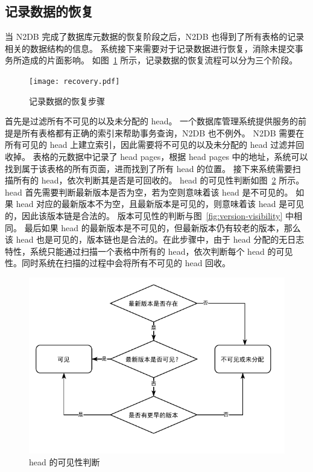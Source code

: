 \subsection{记录数据的恢复}
\label{ssec:record-recovery}

当 N2DB 完成了数据库元数据的恢复阶段之后，N2DB 也得到了所有表格的记录相关的数据结构的信息。
系统接下来需要对于记录数据进行恢复，消除未提交事务所造成的片面影响。
如图~\ref{fig:record-recovery} 所示，记录数据的恢复流程可以分为三个阶段。

\begin{figure}[ht]
    \centering
    \texttt{[image: recovery.pdf]}
    \caption{记录数据的恢复步骤}
    \label{fig:record-recovery}
\end{figure}

首先是过滤所有不可见的以及未分配的 head。
一个数据库管理系统提供服务的前提是所有表格都有正确的索引来帮助事务查询，N2DB 也不例外。
N2DB 需要在所有可见的 head 上建立索引，因此需要将不可见的以及未分配的 head 过滤并回收掉。
表格的元数据中记录了 head pages，根据 head pages 中的地址，系统可以找到属于该表格的所有页面，进而找到了所有 head 的位置。
接下来系统需要扫描所有的 head，依次判断其是否是可回收的。
head 的可见性判断如图~\ref{fig:head-visibility} 所示。
head 首先需要判断最新版本是否为空，若为空则意味着该 head 是不可见的。
如果 head 对应的最新版本不为空，且最新版本是可见的，则意味着该 head 是可见的，因此该版本链是合法的。
版本可见性的判断与图~\ref{fig:version-visibility} 中相同。
最后如果 head 的最新版本是不可见的，但最新版本仍有较老的版本，那么该 head 也是可见的，版本链也是合法的。在此步骤中，由于 head 分配的无日志特性，系统只能通过扫描一个表格中所有的 head，依次判断每个 head 的可见性。同时系统在扫描的过程中会将所有不可见的 head 回收。

\begin{figure}[ht]
    \centering
    \includegraphics[width=1\linewidth]{figures/head_visibility.pdf}
    \caption{head 的可见性判断}
    \label{fig:head-visibility}
\end{figure}

